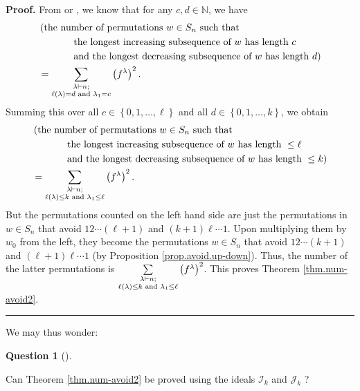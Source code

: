 \documentclass[numbers=enddot,12pt,final,onecolumn,notitlepage]{scrartcl}%
\numberwithin{exer}{subsection}
\theoremstyle{definition}
\newtheorem{quest}[theo]{Question}
\newenvironment{question}[1][]
{\begin{quest}[#1]\begin{leftbar}}
{\end{leftbar}\end{quest}}
\newenvironment{proof}[1][Proof]{\noindent\textbf{#1.} }{\ \rule{0.5em}{0.5em}}
\newenvironment{question}[1][Question]{\noindent\textbf{#1.} }{\ \rule{0.5em}{0.5em}}
\let\sumnonlimits\sum
\renewcommand{\sum}{\sumnonlimits\limits}
\begin{document}
\begin{proof}
From \cite[Theorem 3]{Schens60} or \cite[Proposition 17.5]{Stanle71}, we know
that for any $c,d\in\mathbb{N}$, we have%
\begin{align*}
&  \left(  \text{the number of permutations }w\in S_{n}\text{ such
that}\right. \\
&  \ \ \ \ \ \ \ \ \ \ \left.  \text{the longest increasing subsequence of
}w\text{ has length }c\right. \\
&  \ \ \ \ \ \ \ \ \ \ \left.  \text{and the longest decreasing subsequence of
}w\text{ has length }d\right) \\
&  =\sum\limits_{\substack{\lambda\vdash n;\\\ell\left(  \lambda\right)
=d\text{ and }\lambda_{1}=c}}\left(  f^{\lambda}\right)  ^{2}.
\end{align*}
Summing this over all $c\in\left\{  0,1,\ldots,\ell\right\}  $ and all
$d\in\left\{  0,1,\ldots,k\right\}  $, we obtain%
\begin{align*}
&  \left(  \text{the number of permutations }w\in S_{n}\text{ such
that}\right. \\
&  \ \ \ \ \ \ \ \ \ \ \left.  \text{the longest increasing subsequence of
}w\text{ has length }\leq\ell\right. \\
&  \ \ \ \ \ \ \ \ \ \ \left.  \text{and the longest decreasing subsequence of
}w\text{ has length }\leq k\right) \\
&  =\sum\limits_{\substack{\lambda\vdash n;\\\ell\left(  \lambda\right)  \leq
k\text{ and }\lambda_{1}\leq\ell}}\left(  f^{\lambda}\right)  ^{2}.
\end{align*}
But the permutations counted on the left hand side are just the permutations
in $w\in S_{n}$ that avoid $12\cdots\left(  \ell+1\right)  $ and $\left(
k+1\right)  \ell\cdots1$. Upon multiplying them by $w_{0}$ from the left, they
become the permutations $w\in S_{n}$ that avoid $12\cdots\left(  k+1\right)  $
and $\left(  \ell+1\right)  \ell\cdots1$ (by Proposition
\ref{prop.avoid.up-down}). Thus, the number of the latter permutations is
$\sum\limits_{\substack{\lambda\vdash n;\\\ell\left(  \lambda\right)  \leq
k\text{ and }\lambda_{1}\leq\ell}}\left(  f^{\lambda}\right)  ^{2}$. This
proves Theorem \ref{thm.num-avoid2}.
\end{proof}

We may thus wonder:

\begin{question}
\label{quest.num-avoid-gen}Can Theorem \ref{thm.num-avoid2} be proved using
the ideals $\mathcal{I}_{k}$ and $\mathcal{J}_{k}$ ?
\end{question}
\end{document}
